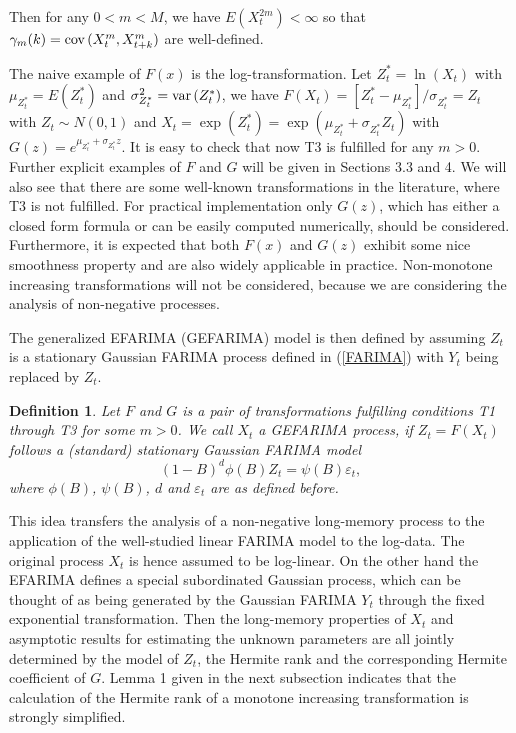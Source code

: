 \documentclass[12pt]{article}
\newtheorem{definition}{Definition}
\newcommand{\var}{\mbox{var\,}}
\newcommand{\cov}{\mbox{cov\,}}
\begin{document}
Then for any $0<m<M$, we have $E(X_t^{2m})<\infty$ so that $\gamma_m(k)=\cov(X_t^m, X_{t+k}^m)$ are well-defined. 

The naive example of $F(x)$ is the log-transformation. Let $Z_t^*=\ln(X_t)$ with $\mu_{Z_t^*}=E(Z_t^*)$ and $\sigma_{Z_t^*}^2=\var(Z_t^*)$, we have $F(X_t)=[Z_t^*-\mu_{Z_t^*}]/\sigma_{Z_t^*}=Z_t$ with $Z_t\sim N(0, 1)$ and $X_t=\exp(Z_t^*)=\exp(\mu_{Z_t^*}+\sigma_{Z_t^*}Z_t)$ with $G(z)=e^{\mu_{Z_t^*}+\sigma_{Z_t^*} z}$. It is easy to check that now T3 is fulfilled for any $m>0$. Further explicit examples of $F$ and $G$ will be given in Sections 3.3 and 4. We will also see that there are some well-known transformations in the literature, where T3 is not fulfilled. For practical implementation only $G(z)$, which has either a closed form formula or can be easily computed numerically, should be considered. Furthermore, it is expected that both $F(x)$ and $G(z)$ exhibit some nice smoothness property and are also widely applicable in practice. Non-monotone increasing transformations will not be considered, because we are considering the analysis of non-negative processes.


The generalized EFARIMA (GEFARIMA) model is then defined by assuming $Z_t$ is a stationary Gaussian FARIMA process defined in (\ref{FARIMA}) with $Y_t$ being replaced by $Z_t$. 
\begin{definition}
Let $F$ and $G$ is a pair of transformations fulfilling conditions T1 through T3 for some $m>0$. We call $X_t$ a GEFARIMA process, if $Z_t=F(X_t)$ follows a (standard) stationary Gaussian FARIMA model  
\begin{equation}
(1-B)^d\phi(B)Z_t=\psi(B)\varepsilon_t, 
\label{GFARIMA}
\end{equation}
where $\phi(B)$, $\psi(B)$, $d$ and $\varepsilon_t$ are as defined before.  
\end{definition}

This idea transfers the analysis of a non-negative long-memory process to the application of the well-studied linear FARIMA model to the log-data. The original process $X_t$ is hence assumed to be log-linear. On the other hand the EFARIMA defines a special subordinated Gaussian process, which can be thought of as being generated by the Gaussian FARIMA $Y_t$ through the fixed exponential transformation. 
Then the long-memory properties of $X_t$ and asymptotic results for estimating the unknown parameters are all jointly determined by the model of $Z_t$, the Hermite rank and the corresponding Hermite coefficient of $G$. 
Lemma 1 given in the next subsection indicates that the calculation of the Hermite rank of a monotone increasing transformation is strongly simplified. 
\end{document}
